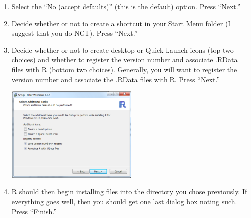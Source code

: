 \documentclass{article}\usepackage[]{graphicx}\usepackage[]{color}
\begin{document}
\begin{enumerate}
  \item Select the ``No (accept defaults)'' (this is the default) option.  Press ``Next.''

  \item Decide whether or not to create a shortcut in your Start Menu folder (I suggest that you do NOT).  Press ``Next.''

  \item Decide whether or not to create desktop or Quick Launch icons (top two choices) and whether to register the version number and associate .RData files with R (bottom two choices).  Generally, you will want to register the version number and associate the .RData files with R.  Press ``Next.''
\begin{center}
  \includegraphics[width=2.5in]{Figs/R_Install_Options1.png}
\end{center}

  \item R should then begin installing files into the directory you chose previously.  If everything goes well, then you should get one last dialog box noting such.  Press ``Finish.''
\end{enumerate}
\end{document}
